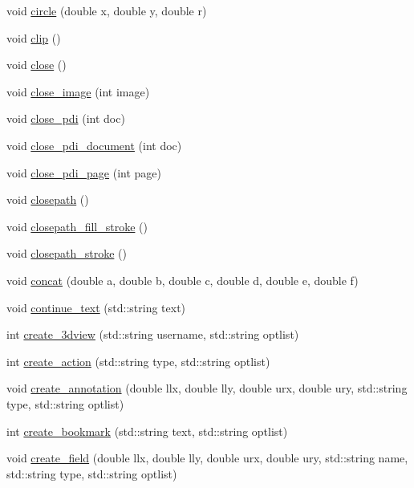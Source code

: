 \begin{DoxyCompactItemize}
\item 
void \hyperlink{classPDFlib_a829708ea81ca5fdc782b41671d289024}{circle} (double x, double y, double r)
\item 
void \hyperlink{classPDFlib_ac975ffef2d14cd63e59c2721934ccc7c}{clip} ()
\item 
void \hyperlink{classPDFlib_ae9242dfb19f5367436a6964546d9d4e6}{close} ()
\item 
void \hyperlink{classPDFlib_ac063ee8ba65df5795c8f488a2238cf7f}{close\+\_\+image} (int image)
\item 
void \hyperlink{classPDFlib_a8b4d6ae7f6df6ac04d54b3f1449849f1}{close\+\_\+pdi} (int doc)
\item 
void \hyperlink{classPDFlib_aefcbc8ddb1ef96388f6f2c61f7e05d7e}{close\+\_\+pdi\+\_\+document} (int doc)
\item 
void \hyperlink{classPDFlib_abba8fa8b8ef399bcb6d57b40bd83a5ee}{close\+\_\+pdi\+\_\+page} (int page)
\item 
void \hyperlink{classPDFlib_a75f331c8e3dda754cfc4acd372366917}{closepath} ()
\item 
void \hyperlink{classPDFlib_a8d3d85a5f00e71fa3127cc42ac5245a1}{closepath\+\_\+fill\+\_\+stroke} ()
\item 
void \hyperlink{classPDFlib_a926f4d493d0625eec0a5638a1318c661}{closepath\+\_\+stroke} ()
\item 
void \hyperlink{classPDFlib_aad54672cea67b8d25f68ae735cf1f4ca}{concat} (double a, double b, double c, double d, double e, double f)
\item 
void \hyperlink{classPDFlib_a4ee3d13f4de6de4dd63f2430c2fb1ee2}{continue\+\_\+text} (std\+::string text)
\item 
int \hyperlink{classPDFlib_ac3fb64cece3d7fbc0b5dd760e5ce490a}{create\+\_\+3dview} (std\+::string username, std\+::string optlist)
\item 
int \hyperlink{classPDFlib_abd882370ecf1a79ddf66c208817ab561}{create\+\_\+action} (std\+::string type, std\+::string optlist)
\item 
void \hyperlink{classPDFlib_af75e9080056e73d1aee1ad0277ac99eb}{create\+\_\+annotation} (double llx, double lly, double urx, double ury, std\+::string type, std\+::string optlist)
\item 
int \hyperlink{classPDFlib_a0ad6d073c261b0b69343fbc2aec77e61}{create\+\_\+bookmark} (std\+::string text, std\+::string optlist)
\item 
void \hyperlink{classPDFlib_adf5520b414e9426b73d375cfbb142a20}{create\+\_\+field} (double llx, double lly, double urx, double ury, std\+::string name, std\+::string type, std\+::string optlist)

\end{DoxyCompactItemize}
